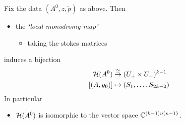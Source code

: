 \begin{paracol}{2} %
  \begin{thm}
    Fix the data $(A^0,z,\tilde p)$ as above.
    Then 
    \begin{itemize}
      \item the \emph{`local monodromy map'}
        \begin{itemize}
          \item taking the stokes matrices
        \end{itemize}
    \end{itemize}
    induces a bijection
    \begin{align*}
      \mathcal{H}(A^0)&\overset{\cong}{\to}(U_+\times U_-)^{k-1}
    \\ \left[(A,g_0)\right] &\mapsto(S_1,\dots,S_{2k-2})
    \end{align*}
    In particular
    \begin{itemize}
      \item $\mathcal{H}(A^0)$ is isomorphic to the vector space $\mathbb{C}^{(k-1)n(n-1)}$.
    \end{itemize}


\end{thm}
\end{paracol}
